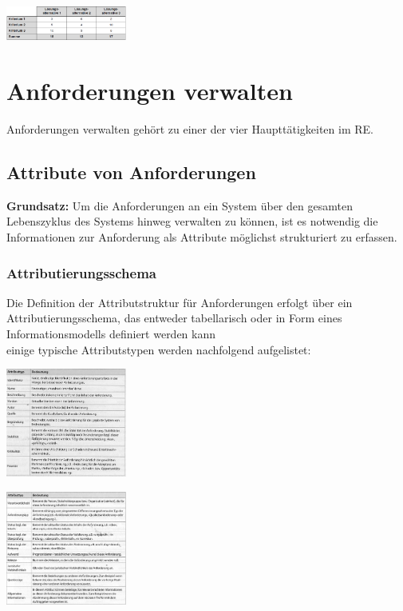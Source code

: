 \documentclass{report}
\newenvironment{Figure}
	{\par\medskip\noindent\minipage{\linewidth}}
	{\endminipage\par\medskip}
\theoremstyle{definition}
\theoremstyle{example}
\begin{document}
\begin{Figure}
   \centering
    \includegraphics[width=150px]{img/Entscheidungsmatrix.png}
        \label{fig:Beispiel einer Entscheidungsmatrix}
\end{Figure}


\section{Anforderungen verwalten}
Anforderungen verwalten gehört zu einer der vier Haupttätigkeiten im RE.

\subsection{Attribute von Anforderungen}
\textbf{Grundsatz:} Um die Anforderungen an ein System über den gesamten Lebenszyklus des Systems hinweg verwalten zu können, ist es notwendig die Informationen zur Anforderung als Attribute möglichst strukturiert zu erfassen.

\subsubsection{Attributierungsschema}
Die Definition der Attributstruktur für Anforderungen erfolgt über ein Attributierungsschema, das entweder tabellarisch oder in Form eines Informationsmodells definiert werden kann\\

einige typische Attributstypen werden nachfolgend aufgelistet:

\begin{Figure}
   \centering
    \includegraphics[width=150px]{img/AttributeI.png}
        \label{fig:Beispiel gewisser Attributtypen I}
\end{Figure}

\begin{Figure}
   \centering
    \includegraphics[width=150px]{img/AttributeII.png}
        \label{fig:Beispiel gewisser Attributtypen II}
\end{Figure}
\end{document}

